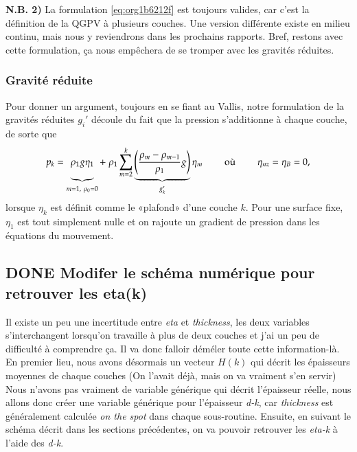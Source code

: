 \documentclass[10pt]{article}
\numberwithin{equation}{section}
\newcommand{\bigno}{\vphantom{\qty(\frac{d}{q})}}
\begin{document}
\textbf{N.B. 2)} La formulation \ref{eq:org1b6212f} est toujours valides, car c'est la définition de la QGPV à plusieurs couches.
Une version différente existe en milieu continu, mais nous y reviendrons dans les prochains rapports.
Bref, restons avec cette formulation, ça nous empêchera de se tromper avec les gravités réduites.

\subsubsection{Gravité réduite}
\label{sec:org451275b}

Pour donner un argument, toujours en se fiant au Vallis, notre formulation de la gravités réduites \(g_i'\) découle du fait que la pression s'additionne à chaque couche, de sorte que 
\begin{equation}
p_{k} = \underbrace{\rho_1 g \eta_1\bigno}_{m=1,\ \rho_0=0} + \ \rho_1 \sum_{m=2}^k \underbrace{\qty(\frac{\rho_m - \rho_{m-1}}{\rho_1} g)}_{g_k'} \eta_m
\hspace{0.8cm} \text{où}\hspace{0.8cm}
\eta_{nz} = \eta_B = 0,
\end{equation}
lorsque \(\eta_k\) est définit comme le «plafond» d'une couche \(k\).
Pour une surface fixe, \(\eta_1\) est tout simplement nulle et on rajoute un gradient de pression dans les équations du mouvement.

\subsection{{\bfseries\sffamily DONE} Modifer le schéma numérique pour retrouver les eta(k)}
\label{sec:org536d1fc}
Il existe un peu une incertitude entre \emph{eta} et \emph{thickness}, les deux variables s'interchangent lorsqu'on travaille à plus de deux couches et j'ai un peu de difficulté à comprendre ça.
Il va donc falloir déméler toute cette information-là.
En premier lieu, nous avons désormais un vecteur \(H(k)\) qui décrit les épaisseurs moyennes de chaque couches (On l'avait déjà, mais on va vraiment s'en servir)
Nous n'avons pas vraiment de variable générique qui décrit l'épaisseur réelle, nous allons donc créer une variable générique pour l'épaisseur \emph{d-k}, car \emph{thickness} est généralement calculée \emph{on the spot} dans chaque sous-routine.
Ensuite, en suivant le schéma décrit dans les sections précédentes, on va pouvoir retrouver les \emph{eta-k} à l'aide des \emph{d-k}.\\[0pt]
\end{document}
